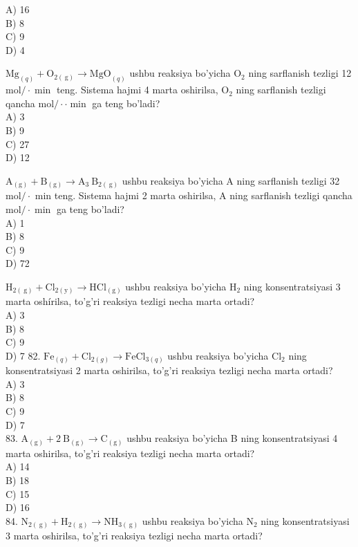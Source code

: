 A) 16\\
B) 8\\
C) 9\\
D) 4
  \item $\mathrm{Mg}_{(q)}+\mathrm{O}_{2(\mathrm{~g})} \rightarrow \mathrm{MgO}_{(q)}$ ushbu reaksiya bo'yicha $\mathrm{O}_{2}$ ning sarflanish tezligi 12 $\mathrm{mol} / \cdot \min$ teng. Sistema hajmi 4 marta oshirilsa, $\mathrm{O}_{2}$ ning sarflanish tezligi qancha $\mathrm{mol} / \cdot \cdot \min$ ga teng bo'ladi?\\
A) 3\\
B) 9\\
C) 27\\
D) 12
  \item $\mathrm{A}_{(\mathrm{g})}+\mathrm{B}_{(\mathrm{g})} \rightarrow \mathrm{A}_{3} \mathrm{~B}_{2(\mathrm{~g})}$ ushbu reaksiya bo'yicha A ning sarflanish tezligi 32 $\mathrm{mol} / \cdot$ min teng. Sistema hajmi 2 marta oshirilsa, A ning sarflanish tezligi qancha $\mathrm{mol} / \cdot \min$ ga teng bo'ladi?\\
A) 1\\
B) 8\\
C) 9\\
D) 72
  \item $\mathrm{H}_{2(\mathrm{~g})}+\mathrm{Cl}_{2(\mathrm{y})} \rightarrow \mathrm{HCl}_{(\mathrm{g})}$ ushbu reaksiya bo'yicha $\mathrm{H}_{2}$ ning konsentratsiyasi 3 marta oshírilsa, to'g'ri reaksiya tezligi necha marta ortadi?\\
A) 3\\
B) 8\\
C) 9\\
D) 7
82. $\mathrm{Fe}_{(q)}+\mathrm{Cl}_{2(g)} \rightarrow \mathrm{FeCl}_{3(q)}$ ushbu reaksiya bo'yicha $\mathrm{Cl}_{2}$ ning konsentratsiyasi 2 marta oshirilsa, to'g'ri reaksiya tezligi necha marta ortadi?\\
A) 3\\
B) 8\\
C) 9\\
D) 7\\
83. $\mathrm{A}_{(\mathrm{g})}+2 \mathrm{~B}_{(\mathrm{g})} \rightarrow \mathrm{C}_{(\mathrm{g})}$ ushbu reaksiya bo'yicha B ning konsentratsiyasi 4 marta oshirilsa, to'g'ri reaksiya tezligi necha marta ortadi?\\
A) 14\\
B) 18\\
C) 15\\
D) 16\\
84. $\mathrm{N}_{2(\mathrm{~g})}+\mathrm{H}_{2(\mathrm{~g})} \rightarrow \mathrm{NH}_{3(\mathrm{~g})}$ ushbu reaksiya bo'yicha $\mathrm{N}_{2}$ ning konsentratsiyasi 3 marta oshirilsa, to'g'ri reaksiya tezligi necha marta ortadi?\\
